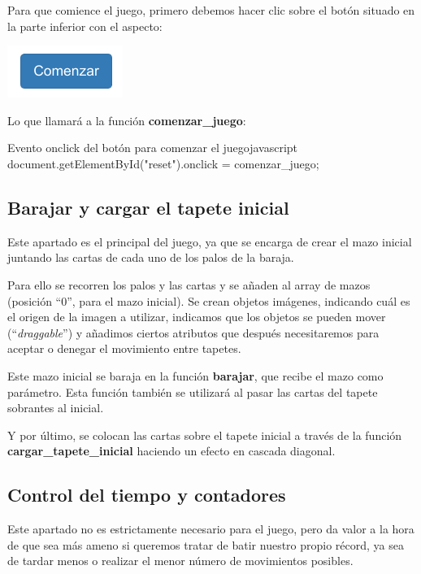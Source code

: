 \documentclass{\ClassPath/viu-tfm-template}
\begin{document}
Para que comience el juego, primero debemos hacer clic sobre el botón situado en la parte inferior con el aspecto:

\vspace{-1.6em}
\begin{center}
    \includegraphics[width=0.2\linewidth]{img/boton.png}
\end{center}
\vspace{-1em}

Lo que llamará a la función \textbf{comenzar\_juego}:

\begin{mycode}{Evento onclick del botón para comenzar el juego}{javascript}{}
document.getElementById("reset").onclick = comenzar_juego;
\end{mycode}


\subsection{Barajar y cargar el tapete inicial}
Este apartado es el principal del juego, ya que se encarga de crear el mazo inicial  juntando las cartas de cada uno de los palos de la baraja.

Para ello se recorren los palos y las cartas y se añaden al array de mazos (posición “0”, para el mazo inicial). Se crean objetos imágenes, indicando cuál es el origen de la imagen a utilizar, indicamos que los objetos se pueden mover (“\textit{draggable}”) y añadimos ciertos atributos que después necesitaremos para aceptar o denegar el movimiento entre tapetes.

Este mazo inicial se baraja en la función \textbf{barajar}, que recibe el mazo como parámetro. Esta función también se utilizará al pasar las cartas del tapete sobrantes al inicial.

Y por último, se colocan las cartas sobre el tapete inicial a través de la función \textbf{cargar\_tapete\_inicial} haciendo un efecto en cascada diagonal.


\subsection{Control del tiempo y contadores}
Este apartado no es estrictamente necesario para el juego, pero da valor a la hora de que sea más ameno si queremos tratar de batir nuestro propio récord, ya sea de tardar menos o realizar el menor número de movimientos posibles.
\end{document}
